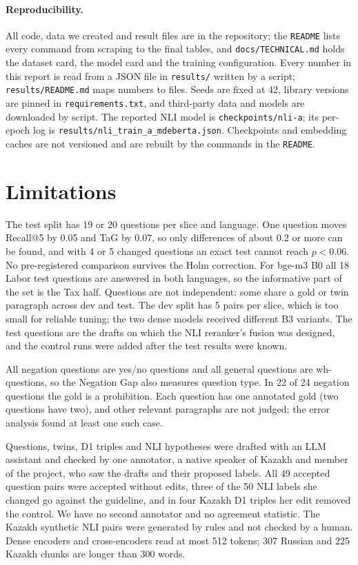 \documentclass[11pt]{article}
\begin{document}
\paragraph{Reproducibility.} All code, data we created and result files are in the repository; the
\texttt{README} lists every command from scraping to the final tables, and \texttt{docs/TECHNICAL.md} holds the
dataset card, the model card and the training configuration. Every number in this report is read from a JSON
file in \texttt{results/} written by a script; \texttt{results/README.md} maps numbers to files. Seeds are fixed
at 42, library versions are pinned in \texttt{requirements.txt}, and third-party data and models are downloaded by
script. The reported NLI model is \texttt{checkpoints/nli-a}; its per-epoch log is
\texttt{results/nli\_train\_a\_mdeberta.json}. Checkpoints and embedding caches are not versioned and are rebuilt by the
commands in the \texttt{README}.

\section*{Limitations}

The test split has 19 or 20 questions per slice and language. One question moves Recall@5 by 0.05 and TaG by
0.07, so only differences of about 0.2 or more can be found, and with 4 or 5 changed questions an exact test
cannot reach $p < 0.06$. No pre-registered comparison survives the Holm correction. For bge-m3 B0 all 18
Labor test questions are answered in both languages, so the informative part of the set is the Tax half.
Questions are not independent: some share a gold or twin paragraph across dev and test. The dev split has 5
pairs per slice, which is too small for reliable tuning; the two dense models received different B3 variants.
The test questions are the drafts on which the NLI reranker's fusion was designed, and the control runs were
added after the test results were known.

All negation questions are yes/no questions and all general questions are wh-questions, so the Negation Gap
also measures question type. In 22 of 24 negation questions the gold is a prohibition. Each question has one
annotated gold (two questions have two), and other relevant paragraphs are not judged; the error analysis found
at least one such case.

Questions, twins, D1 triples and NLI hypotheses were drafted with an LLM assistant and checked by one annotator,
a native speaker of Kazakh and member of the project, who saw the drafts and their proposed labels. All 49
accepted question pairs were accepted without edits, three of the 50 NLI labels she changed go against the
guideline, and in four Kazakh D1 triples her edit removed the control. We have no second annotator and no
agreement statistic. The Kazakh synthetic NLI pairs were generated by rules and not checked by a human.
Dense encoders and cross-encoders read at most 512 tokens; 307 Russian and 225 Kazakh chunks are longer than
300 words.
\end{document}
